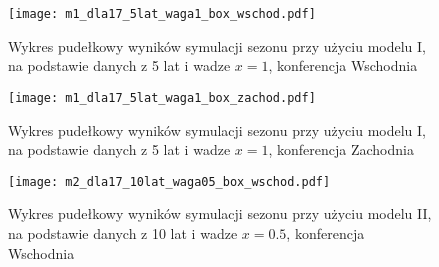 \documentclass[inzynierska]{pwr_wmat_praca_dyplomowa}
\theoremstyle{plain}
\numberwithin{theorem}{chapter}
\theoremstyle{definition}
\numberwithin{theorem}{chapter}
\begin{document}
\begin{figure}[t]
	\hspace*{-3cm}  
	\texttt{[image: m1\_dla17\_5lat\_waga1\_box\_wschod.pdf]}
	\caption{Wykres pudełkowy wyników symulacji sezonu przy użyciu modelu I, na podstawie danych z 5 lat i wadze $x=1$, konferencja Wschodnia}%
	\label{m1_5lat_waga1_wschod_17}
	\centering
\end{figure}

\begin{figure}[t]
	\hspace*{-3cm}  
	\texttt{[image: m1\_dla17\_5lat\_waga1\_box\_zachod.pdf]}
	\caption{Wykres pudełkowy wyników symulacji sezonu przy użyciu modelu I, na podstawie danych z 5 lat i wadze $x=1$, konferencja Zachodnia}
	\label{m1_5lat_waga1_zachod_17}
	\centering
\end{figure}

\begin{figure}[t]
	\hspace*{-3cm}  
	\texttt{[image: m2\_dla17\_10lat\_waga05\_box\_wschod.pdf]}
	\caption{Wykres pudełkowy wyników symulacji sezonu przy użyciu modelu II, na podstawie danych z 10 lat i wadze $x=0.5$, konferencja Wschodnia}
	\label{m2_10lat_waga05_wschod_17}
	\centering
\end{figure}
\end{document}
